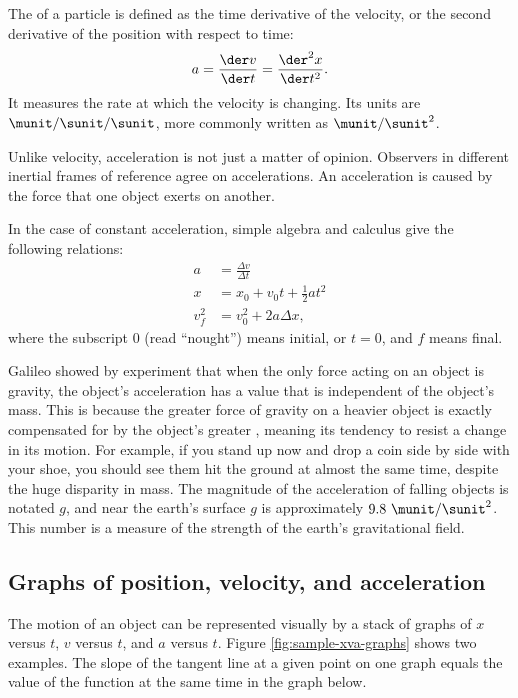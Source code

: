 The 
of a particle is defined as the time derivative of the velocity, or
the second derivative of the position with respect to time:
\begin{equation}
  a = \frac{\der v}{\der t} = \frac{\der^2 x}{\der t^2}.
\end{equation}
It measures the rate at which the velocity is changing.
Its units are $\munit/\sunit/\sunit$, more commonly written as $\munit/\sunit^2$.

Unlike velocity, acceleration is not just a matter of opinion.
Observers in different inertial frames of reference agree on accelerations.
An acceleration is caused by the force that one object exerts on another.

In the case of constant acceleration, simple algebra and calculus give the following relations:
\begin{align}
  a &= \frac{\Delta v}{\Delta t} \\
  x &= x_0+v_0t+\frac{1}{2}at^2 \\
  v_f^2 &= v_0^2 + 2a\Delta x,
\end{align}
where the subscript $0$ (read ``nought'') means initial, or $t=0$, and
$f$ means final.

Galileo showed by experiment
that when the only force acting on an object is gravity, the object's acceleration
has a value that is independent of the object's mass. This is because the greater
force of gravity on a heavier object is exactly compensated for by the object's
greater , meaning its tendency to resist a change in its motion.
For example, if you stand up now and drop a coin side by side with your shoe, you
should see them hit the ground at almost the same time, despite the huge disparity
in mass. The magnitude of the acceleration of falling objects is notated 
$g$, and near the earth's
surface $g$ is approximately $9.8\ \munit/\sunit^2$. This number is a measure of
the strength of the earth's gravitational field.

\subsection{Graphs of position, velocity, and acceleration}

The motion of an object can be represented visually by a stack of graphs
of $x$ versus $t$, $v$ versus $t$, and $a$ versus $t$.
Figure \ref{fig:sample-xva-graphs} shows two examples. The slope of the tangent
line at a given point on one graph equals the value of the function at the
same time in the graph below.

